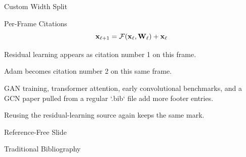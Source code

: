\documentclass[10pt,aspectratio=169]{ntuabeamer}
\begin{document}
\begin{frame}{Custom Width Split}
\end{frame}

\begin{frame}{Per-Frame Citations}
  \small
  \[
    \mathbf{x}_{\ell+1} = \mathcal{F}(\mathbf{x}_{\ell}, \mathbf{W}_{\ell}) + \mathbf{x}_{\ell}
  \]

  Residual learning appears as citation number 1 on this frame.

  \vspace{0.18cm}

  Adam becomes citation number 2 on this same frame.

  \vspace{0.18cm}

  GAN training, transformer attention, early convolutional benchmarks, and a GCN paper pulled from a regular `.bib` file add more footer entries.

  \vspace{0.18cm}

  Reusing the residual-learning source again keeps the same mark.
\end{frame}

\begin{frame}{Reference-Free Slide}
\end{frame}

\begin{frame}{Traditional Bibliography}
  \printbibliography[heading=none]
\end{frame}
\end{document}
